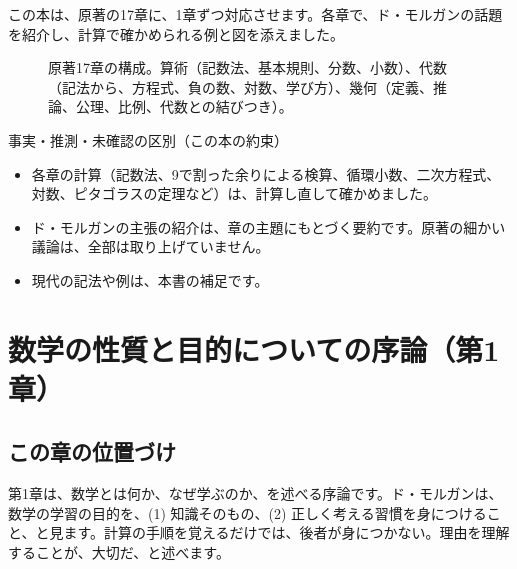 \documentclass[a4paper,11pt,openany]{ltjsbook}
\begin{document}
この本は、原著の17章に、1章ずつ対応させます。各章で、ド・モルガンの話題を紹介し、計算で確かめられる例と図を添えました。

\begin{figure}[htbp]
\centering
{}
\caption{原著17章の構成。算術（記数法、基本規則、分数、小数）、代数（記法から、方程式、負の数、対数、学び方）、幾何（定義、推論、公理、比例、代数との結びつき）。}
\end{figure}

\begin{notebox}{事実・推測・未確認の区別（この本の約束）}
\begin{itemize}[leftmargin=*]
\item 各章の計算（記数法、9で割った余りによる検算、循環小数、二次方程式、対数、ピタゴラスの定理など）は、計算し直して確かめました。
\item ド・モルガンの主張の紹介は、章の主題にもとづく要約です。原著の細かい議論は、全部は取り上げていません。
\item 現代の記法や例は、本書の補足です。
\end{itemize}
\end{notebox}

\chapter{数学の性質と目的についての序論（第1章）}

\section{この章の位置づけ}

第1章は、数学とは何か、なぜ学ぶのか、を述べる序論です。ド・モルガンは、数学の学習の目的を、(1) 知識そのもの、(2) 正しく考える習慣を身につけること、と見ます。計算の手順を覚えるだけでは、後者が身につかない。理由を理解することが、大切だ、と述べます。
\end{document}
